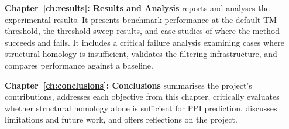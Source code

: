 \textbf{Chapter~\ref{ch:results}: Results and Analysis} reports and analyses the experimental results.
It presents benchmark performance at the default TM threshold, the threshold sweep results, and case studies of where the method succeeds and fails.
It includes a critical failure analysis examining cases where structural homology is insufficient, validates the filtering infrastructure, and compares performance against a baseline.

\textbf{Chapter~\ref{ch:conclusions}: Conclusions} summarises the project's contributions, addresses each objective from this chapter, critically evaluates whether structural homology alone is sufficient for PPI prediction, discusses limitations and future work, and offers reflections on the project.
